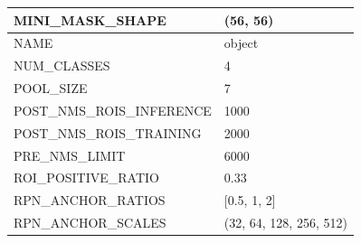 \begin{longtable}[h]{|l|l|}
	MINI\_MASK\_SHAPE               & (56, 56)                                                                                                                                                                               \\ \hline
	NAME                            & object                                                                                                                                                                                 \\ \hline
	NUM\_CLASSES                    & 4                                                                                                                                                                                      \\ \hline
	POOL\_SIZE                      & 7                                                                                                                                                                                      \\ \hline
	POST\_NMS\_ROIS\_INFERENCE      & 1000                                                                                                                                                                                   \\ \hline
	POST\_NMS\_ROIS\_TRAINING       & 2000                                                                                                                                                                                   \\ \hline
	PRE\_NMS\_LIMIT                 & 6000                                                                                                                                                                                   \\ \hline
	ROI\_POSITIVE\_RATIO            & 0.33                                                                                                                                                                                   \\ \hline
	RPN\_ANCHOR\_RATIOS             & {[}0.5, 1, 2{]}                                                                                                                                                                        \\ \hline
	RPN\_ANCHOR\_SCALES             & (32, 64, 128, 256, 512)                                                                                                                                                                \\ \hline

\end{longtable}
